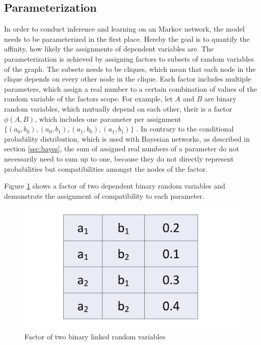 \subsection{Parameterization} \label{sec:param}


In order to conduct inference and learning on an Markov network, the model needs to be parameterized in the first place. Hereby the goal is to quantify the affinity, how likely the assignments of dependent variables are. The parameterization is achieved by assigning factors to subsets of random variables of the graph. The subsets needs to be cliques, which mean that each node in the clique depends on every other node in the clique. Each factor includes multiple parameters, which assign a real number to a certain combination of values of the random variable of the factors scope. For example, let $A$ and $B$ are binary random variables, which mutually depend on each other, their is a factor $\phi(A,B)$, which includes one parameter per assignment $\{(a_0,b_0),(a_0,b_1),(a_1,b_0),(a_1,b_1)\}$ . In contrary to the conditional probability distribution, which is used with Bayesian networks, as described in section \ref{sec:bayes}, the sum of assigned real numbers of a parameter do not necessarily need to sum up to one, because they do not directly represent probabilities but compatibilities amongst the nodes of the factor.

Figure \ref{fig:param} shows a factor of two dependent binary random variables and demonstrate the assignment of compatibility to each parameter.

\begin{figure}[htpb]
  \centering
  	\includegraphics[scale=0.3]{img/param.pdf} 
  \caption{Factor of two binary linked random variables}
  \label{fig:param}
\end{figure}

